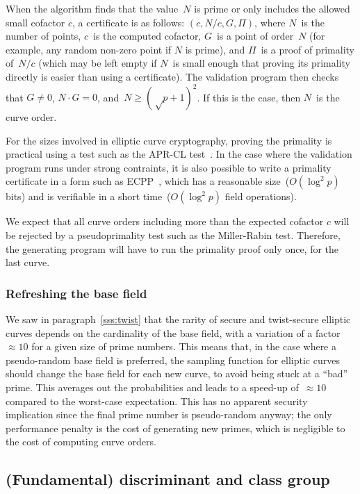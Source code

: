 \documentclass[twocolumn,letterpaper,10pt]{article}
\begin{document}
When the algorithm finds that the value~$N$ is prime
or only includes the allowed small cofactor $c$,
a certificate is as follows: $(c, N/c, G, Π)$,
where $N$~is the number of points, $c$~is the computed cofactor,
$G$~is a point of order~$N$
(for example, any random non-zero point if $N$ is prime),
and $Π$~is a proof of primality of~$N/c$
(which may be left empty if $N$~is small enough
that proving its primality directly is easier than using a certificate).
The validation program then checks that $G ≠ 0$,
$N · G = 0$, and~$N ≥ (√p+1)^2$.
If this is the case, then $N$~is the curve order.

For the sizes involved in elliptic curve cryptography,
proving the primality is practical using a test such as
the APR-CL test~\cite{fcs1980adleman,mathcomp1984cl}.
In the case where the validation program runs under strong contraints,
it is also possible to write a primality certificate
in a form such as ECPP~\cite{mathcomp1993am},
which has a reasonable size~($O(\log^2 p)$ bits)
and is verifiable in a short time~($O(\log^2 p)$ field operations).

We expect that all curve orders including more than the expected cofactor $c$
will be rejected by a pseudoprimality test such as the Miller-Rabin test.
Therefore, the generating program will have to run the primality proof
only once, for the last curve.

\subsubsection{Refreshing the base field}

We saw in paragraph~\ref{sss:twist} that the rarity of
secure and twist-secure elliptic curves depends on the
cardinality of the base field,
with a variation of a factor~$≈ 10$ for a given size of prime numbers.
This means that,
in the case where a pseudo-random base field is preferred,
the sampling function for elliptic curves should change the base field
for each new curve, to avoid being stuck at a ``bad'' prime.
This averages out the probabilities
and leads to a speed-up of~$≈ 10$ compared to the worst-case expectation.
This has no apparent security implication
since the final prime number is pseudo-random anyway;
the only performance penalty is the cost of generating new primes,
which is negligible to the cost of computing curve orders.


\subsection{(Fundamental) discriminant and class group}
\end{document}
